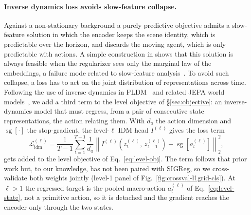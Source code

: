 \paragraph{Inverse dynamics loss avoids slow-feature collapse.}
Against a non-stationary background a purely predictive objective admits a slow-feature
solution in which the encoder keeps the scene identity, which is predictable over the horizon, and discards the moving agent, which is only predictable with actions. A simple construction in  shows that this solution is always feasible when the regularizer sees only the marginal law of the embeddings, a failure mode related to slow-feature analysis~\citep{wiskott2002slow}.
To avoid such collapse, a loss has to act on the joint distribution of representations
across time. Following the use of inverse dynamics in
PLDM~\citep{sobal2025pldm} and related JEPA world models~\citep{terver2026ebjepa,sobal2022slowfeatures},
we add a third term
to the level objective of \S\ref{sec:objective}: an inverse-dynamics model that must regress, from a pair of consecutive state representations, the action relating them.
With $d_a$ the action dimension and $\operatorname{sg}[\cdot]$ the stop-gradient, the
level-$\ell$ IDM head $I^{(\ell)}$ gives the loss term
\begin{equation}
\label{eq:idm-loss}
\mathcal{L}^{(\ell)}_{\mathrm{idm}}
= \frac{1}{T-1}\sum_{t=1}^{T-1}
\frac{1}{d_a}\left\|
I^{(\ell)}\!\left(z^{(\ell)}_t,\, z^{(\ell)}_{t+1}\right)
- \operatorname{sg}\!\left[a^{(\ell)}_t\right]
\right\|_2^2 ,
\end{equation}
gets added to the level objective of Eq.~\eqref{eq:level-obj}.
The term follows that prior work but, to our knowledge, has not been paired with SIGReg, so we cross-validate both weights jointly (level-1 panel of Fig.~\ref{fig:crossval-l1grid-cls}).
At $\ell>1$ the regressed target is the
pooled macro-action $a^{(\ell)}_t$ of Eq.~\eqref{eq:level-state}, not a primitive action, so it is detached and the gradient reaches the encoder only through the two states.

